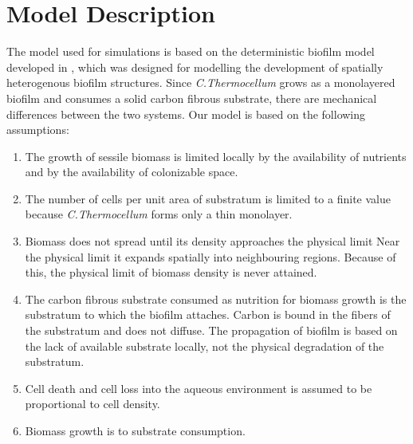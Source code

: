 \section{Model Description}
The model used for simulations is based on the deterministic biofilm model developed in \cite{eberl2001deterministic}, which was designed for modelling the development of spatially heterogenous biofilm structures.
Since \textit{C.Thermocellum} grows as a monolayered biofilm and consumes a solid carbon fibrous substrate, there are mechanical differences between the two systems.
Our model is based on the following assumptions:
\begin{enumerate}
  \item The growth of sessile biomass is limited locally by the availability of nutrients and by the availability of colonizable space.
    \label{assump:growth_inhib}
  \item The number of cells per unit area of substratum is limited to a finite value because \textit{C.Thermocellum} forms only a thin monolayer. 
    \label{assump:finite_density}
  \item Biomass does not spread until its density approaches the physical limit
    Near the physical limit it expands spatially into neighbouring regions.
    Because of this, the physical limit of biomass density is never attained.
    \label{assump:diffusion}
  \item The carbon fibrous substrate consumed as nutrition for biomass growth is the substratum to which the biofilm attaches.
    Carbon is bound in the fibers of the substratum and does not diffuse.
    The propagation of biofilm is based on the lack of available substrate locally, not the physical degradation of the substratum.
    \label{assump:substratum}
  \item Cell death and cell loss into the aqueous environment is assumed to be proportional to cell density.
    \label{assump:bio_death}
  \item Biomass growth is to substrate consumption.
    \label{assump:sub_consumption}
\end{enumerate}

